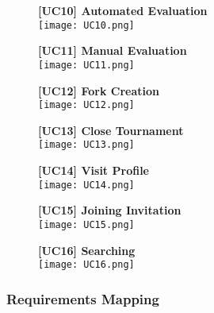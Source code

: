 \documentclass{article}
\begin{document}
\begin{figure}[H]
  \centering
  \textbf{[UC10] Automated Evaluation} \\
  \texttt{[image: UC10.png]}
\end{figure}

\begin{figure}[H]
  \centering
  \textbf{[UC11] Manual Evaluation} \\
  \texttt{[image: UC11.png]}
\end{figure}

\begin{figure}[H]
  \centering
  \textbf{[UC12] Fork Creation} \\
  \texttt{[image: UC12.png]}
\end{figure}

\begin{figure}[H]
    \centering
    \textbf{[UC13] Close Tournament} \\
    \texttt{[image: UC13.png]} 
\end{figure}

\begin{figure}[H]
    \centering
    \textbf{[UC14] Visit Profile} \\
    \texttt{[image: UC14.png]} 
\end{figure}

\begin{figure}[H]
    \centering
    \textbf{[UC15] Joining Invitation} \\
    \texttt{[image: UC15.png]} 
\end{figure}

\begin{figure}[H]
    \centering
    \textbf{[UC16] Searching} \\
    \texttt{[image: UC16.png]} 
\end{figure}
\newpage
\subsubsection{Requirements Mapping}
\end{document}
